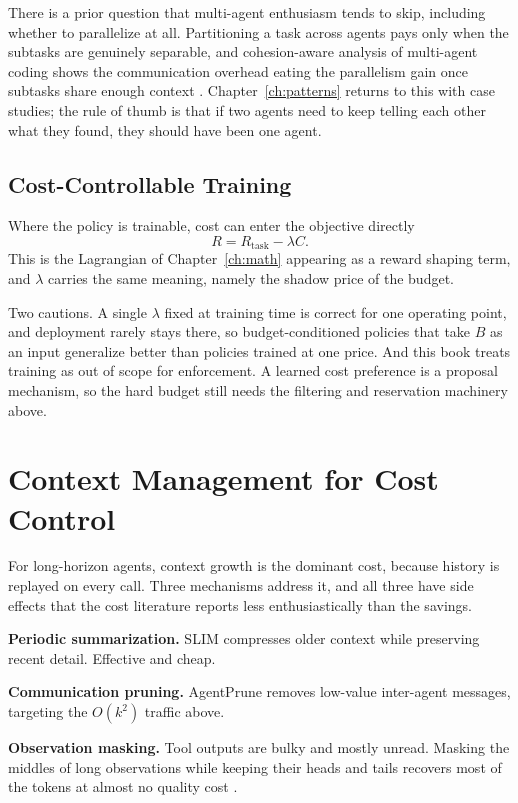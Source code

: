 There is a prior question that multi-agent enthusiasm tends to skip, including whether to
parallelize at all. Partitioning a task across agents pays only when the subtasks
are genuinely separable, and cohesion-aware analysis of multi-agent coding shows
the communication overhead eating the parallelism gain once subtasks share enough
context \cite{cohesion2026}. Chapter~\ref{ch:patterns} returns to this with case
studies; the rule of thumb is that if two agents need to keep telling each other
what they found, they should have been one agent.

\subsection{Cost-Controllable Training}

Where the policy is trainable, cost can enter the objective directly
\[
R = R_{\text{task}} - \lambda C.
\]
This is the Lagrangian of Chapter~\ref{ch:math} appearing as a reward shaping
term, and $\lambda$ carries the same meaning, namely the shadow price of the budget.

Two cautions. A single $\lambda$ fixed at training time is correct for one
operating point, and deployment rarely stays there, so budget-conditioned
policies that take $B$ as an input generalize better than policies trained at one
price. And this book treats training as out of scope for enforcement. A learned cost
preference is a proposal mechanism, so the hard budget still needs the filtering
and reservation machinery above.

\section{Context Management for Cost Control}

For long-horizon agents, context growth is the dominant cost, because history is
replayed on every call. Three mechanisms address it, and all three have side
effects that the cost literature reports less enthusiastically than the savings.

\textbf{Periodic summarization.} SLIM \cite{slim2025} compresses older context
while preserving recent detail. Effective and cheap.

\textbf{Communication pruning.} AgentPrune \cite{agentprune2025} removes
low-value inter-agent messages, targeting the $O(k^2)$ traffic above.

\textbf{Observation masking.} Tool outputs are bulky and mostly unread. Masking
the middles of long observations while keeping their heads and tails recovers
most of the tokens at almost no quality cost \cite{observationmasking2025}.

